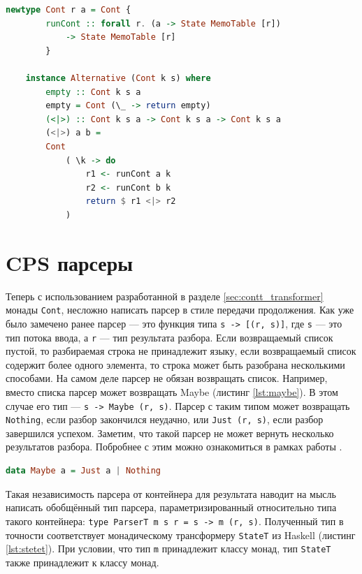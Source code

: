 \documentclass[times]{itmo-student-thesis}
\begin{document}
\begin{lstlisting}[language=Haskell,float=!h,caption={Недетерминированный Cont с состоянием},label={lst:nondeterministic_cont_type}]
    newtype Cont r a = Cont { 
        runCont :: forall r. (a -> State MemoTable [r]) 
            -> State MemoTable [r] 
        }

    instance Alternative (Cont k s) where
        empty :: Cont k s a
        empty = Cont (\_ -> return empty)
        (<|>) :: Cont k s a -> Cont k s a -> Cont k s a
        (<|>) a b =
        Cont
            ( \k -> do
                r1 <- runCont a k
                r2 <- runCont b k
                return $ r1 <|> r2
            )
\end{lstlisting}

\section{CPS парсеры}\label{sec:cps_parser}

Теперь с использованием разработанной в разделе \ref{sec:contt_transformer} монады \lstinline{Cont}, несложно написать парсер в стиле 
передачи продолжения. Как уже было замечено ранее парсер --- это функция типа \lstinline{s -> [(r, s)]}, где \lstinline{s} --- это
тип потока ввода, а \lstinline{r} --- тип результата разбора. Если возвращаемый список пустой, то разбираемая строка не принадлежит
языку, если возвращаемый список содержит более одного элемента, то строка может быть разобрана несколькими способами.
На самом деле парсер не обязан возвращать список. Например, вместо списка парсер может возвращать Maybe (листинг \ref{lst:maybe}).
В этом случае его тип --- \lstinline{s -> Maybe (r, s)}. Парсер с таким типом может возвращать \lstinline{Nothing}, если разбор 
закончился неудачно, или \lstinline{Just (r, s)}, если разбор завершился успехом. Заметим, что такой парсер не может вернуть 
несколько результатов разбора. Побробнее с этим можно ознакомиться в рамках работы \cite{hutton_monadic_nodate}.

\begin{lstlisting}[language=Haskell,float=!h,caption={Тип Maybe в Haskell},label={lst:maybe}]
  data Maybe a = Just a | Nothing
\end{lstlisting}

Такая независимость парсера от контейнера для результата наводит на мысль написать обобщённый тип парсера,
параметризированный относительно типа такого контейнера: \lstinline {type ParserT m s r = s -> m (r, s)}. Полученный
тип в точности соответствует монадическому трансформеру \lstinline{StateT} из Haskell (листинг \ref{lst:stetet}). При условии, что	тип
\lstinline{m} принадлежит классу монад, тип \lstinline{StateT} также принадлежит к классу монад. 
\end{document}
